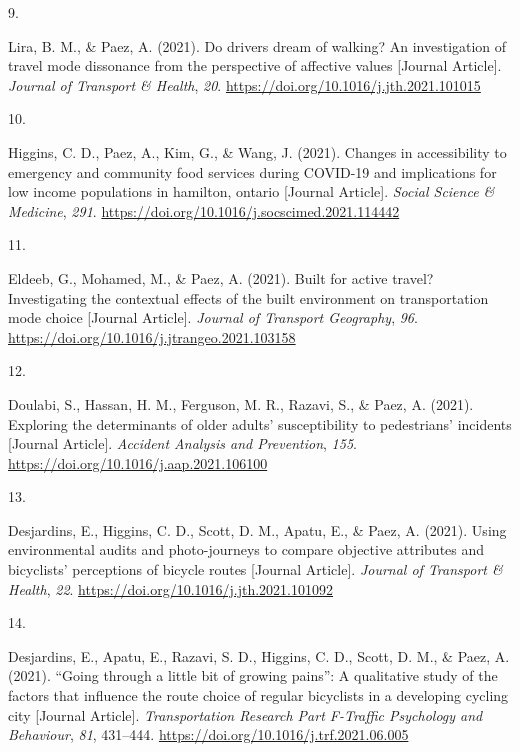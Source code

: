 \documentclass[11pt,a4paper,]{awesome-cv}
\newlength{\csllabelwidth}
\newcommand{\CSLLeftMargin}[1]{\parbox[t]{\csllabelwidth}{#1}}
\newcommand{\CSLRightInline}[1]{\parbox[t]{\linewidth - \csllabelwidth}{#1}}
\begin{document}
\leavevmode{}%
\CSLLeftMargin{9. }
\CSLRightInline{Lira, B. M., \& Paez, A. (2021). Do drivers dream of
walking? An investigation of travel mode dissonance from the perspective
of affective values {[}Journal Article{]}. \emph{Journal of Transport \&
Health}, \emph{20}. \url{https://doi.org/10.1016/j.jth.2021.101015}}

\leavevmode{}%
\CSLLeftMargin{10. }
\CSLRightInline{Higgins, C. D., Paez, A., Kim, G., \& Wang, J. (2021).
Changes in accessibility to emergency and community food services during
COVID-19 and implications for low income populations in hamilton,
ontario {[}Journal Article{]}. \emph{Social Science \& Medicine},
\emph{291}. \url{https://doi.org/10.1016/j.socscimed.2021.114442}}

\leavevmode{}%
\CSLLeftMargin{11. }
\CSLRightInline{Eldeeb, G., Mohamed, M., \& Paez, A. (2021). Built for
active travel? Investigating the contextual effects of the built
environment on transportation mode choice {[}Journal Article{]}.
\emph{Journal of Transport Geography}, \emph{96}.
\url{https://doi.org/10.1016/j.jtrangeo.2021.103158}}

\leavevmode{}%
\CSLLeftMargin{12. }
\CSLRightInline{Doulabi, S., Hassan, H. M., Ferguson, M. R., Razavi, S.,
\& Paez, A. (2021). Exploring the determinants of older adults'
susceptibility to pedestrians' incidents {[}Journal Article{]}.
\emph{Accident Analysis and Prevention}, \emph{155}.
\url{https://doi.org/10.1016/j.aap.2021.106100}}

\leavevmode{}%
\CSLLeftMargin{13. }
\CSLRightInline{Desjardins, E., Higgins, C. D., Scott, D. M., Apatu, E.,
\& Paez, A. (2021). Using environmental audits and photo-journeys to
compare objective attributes and bicyclists' perceptions of bicycle
routes {[}Journal Article{]}. \emph{Journal of Transport \& Health},
\emph{22}. \url{https://doi.org/10.1016/j.jth.2021.101092}}

\leavevmode{}%
\CSLLeftMargin{14. }
\CSLRightInline{Desjardins, E., Apatu, E., Razavi, S. D., Higgins, C.
D., Scott, D. M., \& Paez, A. (2021). {``Going through a little bit of
growing pains''}: A qualitative study of the factors that influence the
route choice of regular bicyclists in a developing cycling city
{[}Journal Article{]}. \emph{Transportation Research Part F-Traffic
Psychology and Behaviour}, \emph{81}, 431--444.
\url{https://doi.org/10.1016/j.trf.2021.06.005}}
\end{document}
